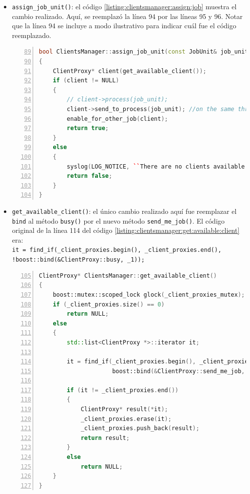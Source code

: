 \begin{itemize}
\item \texttt{assign\_job\_unit()}: el código \ref{listing:clientsmanager:assign:job} muestra el cambio realizado. Aquí, se reemplazó la línea 94 por las líneas 95 y 96. Notar que la línea 94 se incluye a modo ilustrativo para indicar cuál fue el código reemplazado.
\begin{lstlisting}[frame=shadowbox, language=C++, numbers=left, xleftmargin=8mm, framexleftmargin=22pt, basicstyle=\scriptsize, numberstyle=\footnotesize, breaklines=true, breakatwhitespace=false, captionpos=b, caption={Método \texttt{assign\_job\_unit()} de la clase \texttt{ClientsManager}}, label=listing:clientsmanager:assign:job, backgroundcolor=\color{gris}, firstnumber=89, tabsize=4]
bool ClientsManager::assign_job_unit(const JobUnit& job_unit)
{
    ClientProxy* client(get_available_client());
    if (client != NULL)
    {
    	// client->process(job_unit);
        client->send_to_process(job_unit); //on the same thread, works asynchronously
        enable_for_other_job(client);
        return true;
    }
    else
    {
        syslog(LOG_NOTICE, ``There are no clients available.'');
        return false;
    }
}
\end{lstlisting}
\item \texttt{get\_available\_client()}: el único cambio realizado aquí fue reemplazar el \texttt{bind} al método \texttt{busy()} por el nuevo método \texttt{send\_me\_job()}. El código original de la línea 114 del código \ref{listing:clientsmanager:get:available:client} era:\\

\texttt{it = find\_if(\_client\_proxies.begin(), \_client\_proxies.end(), !boost::bind(\&ClientProxy::busy, \_1));}
\newpage
\begin{lstlisting}[frame=shadowbox, language=C++, numbers=left, xleftmargin=8mm, framexleftmargin=22pt, basicstyle=\scriptsize, numberstyle=\footnotesize, breaklines=true, breakatwhitespace=false, captionpos=b, caption={Método \texttt{get\_available\_client()} de la clase \texttt{ClientsManager}}, label=listing:clientsmanager:get:available:client, backgroundcolor=\color{gris}, firstnumber=105, tabsize=4, keywordstyle=\color{Blue}]
ClientProxy* ClientsManager::get_available_client()
{
    boost::mutex::scoped_lock glock(_client_proxies_mutex);
    if (_client_proxies.size() == 0)
        return NULL;
    else
    {
        std::list<ClientProxy *>::iterator it;

        it = find_if(_client_proxies.begin(), _client_proxies.end(),
                     boost::bind(&ClientProxy::send_me_job, _1));

        if (it != _client_proxies.end())
        {
            ClientProxy* result(*it);
            _client_proxies.erase(it);
            _client_proxies.push_back(result);
            return result;
        }
        else
            return NULL;
    }
}
\end{lstlisting}
\end{itemize}

